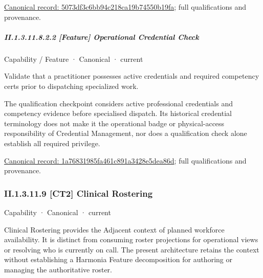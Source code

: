{\footnotesize \href{../../../../continuum/strategy/capability/feature/5073df3c6bb94c218ca19b74550b19fa.md}{Canonical record: 5073df3c6bb94c218ca19b74550b19fa}; full qualifications and provenance.}\par
\subparagraph*{II.1.3.11.8.2.2 [Feature] Operational Credential Check}
\label{navigation:II.1.3.11.8.2.2}

\label{element:1a76831985fa461c891a3428e5dea86d}
{\small Capability / Feature · Canonical · current}\par

Validate that a practitioner possesses active credentials and required competency certs prior to dispatching specialized work.



The qualification checkpoint considers active professional credentials and competency evidence before specialised dispatch. Its historical credential terminology does not make it the operational badge or physical-access responsibility of Credential Management, nor does a qualification check alone establish all required privilege.


{\footnotesize \href{../../../../continuum/strategy/capability/feature/1a76831985fa461c891a3428e5dea86d.md}{Canonical record: 1a76831985fa461c891a3428e5dea86d}; full qualifications and provenance.}\par
\subsubsection*{II.1.3.11.9 [CT2] Clinical Rostering}
\label{navigation:II.1.3.11.9}

\label{element:192ca88a289544dcbf6adaf643f39969}
{\small Capability · Canonical · current}\par

Clinical Rostering provides the Adjacent context of planned workforce availability. It is distinct from consuming roster projections for operational views or resolving who is currently on call. The present architecture retains the context without establishing a Harmonia Feature decomposition for authoring or managing the authoritative roster.



